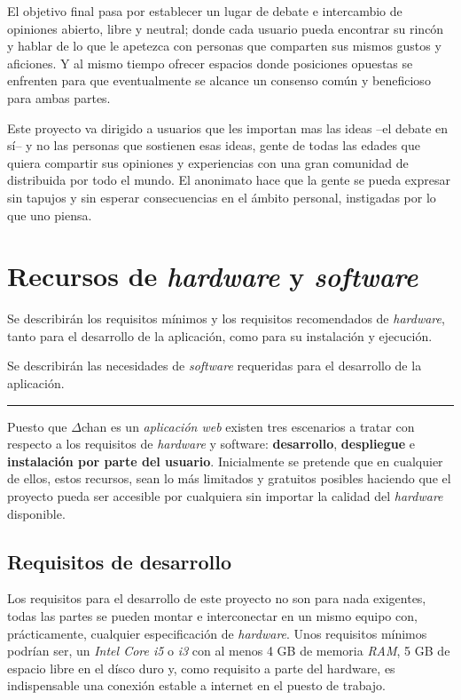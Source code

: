 \documentclass[12pt,a4paper,titlepage]{article}
\newcommand\projectname{$\Delta$chan}
\begin{document}
    El objetivo final pasa por establecer un lugar de debate e intercambio de opiniones abierto, libre y neutral; donde cada usuario pueda encontrar su rincón y hablar de lo que le apetezca con personas que comparten sus mismos gustos y aficiones. Y al mismo tiempo ofrecer espacios donde posiciones opuestas se enfrenten para que eventualmente se alcance un consenso común y beneficioso para ambas partes.
    
    Este proyecto va dirigido a usuarios que les importan mas las ideas --el debate en sí-- y no las personas que sostienen esas ideas, gente de todas las edades que quiera compartir sus opiniones y experiencias con una gran comunidad de distribuida por todo el mundo. El anonimato hace que la gente se pueda expresar sin tapujos y sin esperar consecuencias en el ámbito personal, instigadas por lo que uno piensa.

    \section{Recursos de \textit{hardware} y \textit{software}}

    Se describirán los requisitos mínimos y los requisitos recomendados de \textit{hardware}, tanto para el desarrollo de la aplicación, como para su instalación y ejecución.

    Se describirán las necesidades de \textit{software} requeridas para el desarrollo de la aplicación.

    \bigskip\hrule\bigskip

    Puesto que {\projectname} es un \emph{aplicación web} existen tres escenarios a tratar con respecto a los requisitos de \textit{hardware} y software: \textbf{desarrollo}, \textbf{despliegue} e \textbf{instalación por parte del usuario}. Inicialmente se pretende que en cualquier de ellos, estos recursos, sean lo más limitados y gratuitos posibles haciendo que el proyecto pueda ser accesible por cualquiera sin importar la calidad del \textit{hardware} disponible.

    \subsection{Requisitos de desarrollo}

    Los requisitos para el desarrollo de este proyecto no son para nada exigentes, todas las partes se pueden montar e interconectar en un mismo equipo con, prácticamente, cualquier especificación de \textit{hardware}. Unos requisitos mínimos podrían ser, un \textit{Intel Core i5} o \textit{i3} con al menos 4 GB de memoria \textit{RAM}, 5 GB de espacio libre en el dísco duro y, como requisito a parte del hardware, es indispensable una conexión estable a internet en el puesto de trabajo.
\end{document}
